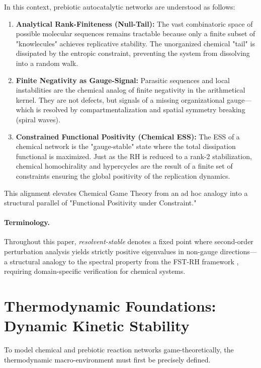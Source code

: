 \documentclass[12pt,a4paper]{article}
\theoremstyle{remark}
\begin{document}
In this context, prebiotic autocatalytic networks are understood as follows:
\begin{enumerate}[label=\alph*)]
    \item \textbf{Analytical Rank-Finiteness (Null-Tail):} The vast combinatoric space of possible molecular sequences remains tractable because only a finite subset of "knowlecules" achieves replicative stability. The unorganized chemical "tail" is dissipated by the entropic constraint, preventing the system from dissolving into a random walk.
    \item \textbf{Finite Negativity as Gauge-Signal:} Parasitic sequences and local instabilities are the chemical analog of finite negativity in the arithmetical kernel. They are not defects, but signals of a missing organizational gauge—which is resolved by compartmentalization and spatial symmetry breaking (spiral waves).
    \item \textbf{Constrained Functional Positivity (Chemical ESS):} The ESS of a chemical network is the "gauge-stable" state where the total dissipation functional is maximized. Just as the RH is reduced to a rank-2 stabilization, chemical homochirality and hypercycles are the result of a finite set of constraints ensuring the global positivity of the replication dynamics.
\end{enumerate}

This alignment elevates Chemical Game Theory from an ad hoc analogy into a structural parallel of "Functional Positivity under Constraint."

\paragraph{Terminology.} Throughout this paper, \emph{resolvent-stable} denotes a fixed point where second-order perturbation analysis yields strictly positive eigenvalues in non-gauge directions---a structural analogy to the spectral property from the FST-RH framework \citep{GeigerRH2026b}, requiring domain-specific verification for chemical systems.

\section{Thermodynamic Foundations: Dynamic Kinetic Stability}
\label{sec:thermodynamics}

To model chemical and prebiotic reaction networks game-theoretically, the thermodynamic macro-environment must first be precisely defined.
\end{document}
